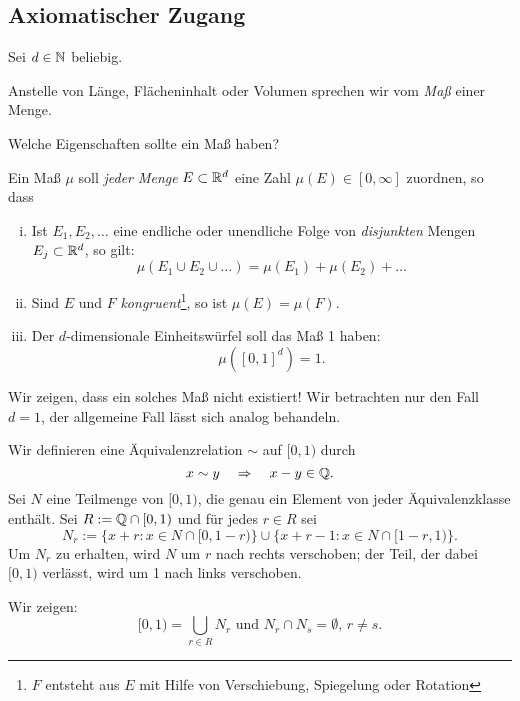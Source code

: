 \documentclass[
 a4paper,
 12pt,
 parskip=half
 ]{scrreprt}
\theoremstyle{plain}
\theoremstyle{definition}
\numberwithin{equation}{section}
\begin{document}
\subsection*{Axiomatischer Zugang}
Sei $d \in \mathbb{N}$ beliebig. 

Anstelle von Länge, Flächeninhalt oder Volumen sprechen wir vom \emph{Maß} einer Menge.

Welche Eigenschaften sollte ein Maß haben?

Ein Maß $\mu$ soll \emph{jeder Menge} $E \subset \mathbb{R}^d$ eine Zahl $\mu(E) \in [0, \infty]$ zuordnen, so dass
\begin{enumerate}[(i)]
 \item Ist $E_1, E_2, \ldots$ eine endliche oder unendliche Folge von \emph{disjunkten} Mengen $E_j \subset \mathbb{R}^d$, so gilt:
 \[ \mu(E_1 \cup E_2 \cup \ldots ) = \mu(E_1) + \mu(E_2) + \ldots \]
 \item Sind $E$ und $F$ \emph{kongruent}\footnote{$F$ entsteht aus $E$ mit Hilfe von Verschiebung, Spiegelung oder Rotation}, so ist $\mu(E) = \mu(F)$.
 \item Der $d$-dimensionale Einheitswürfel soll das Maß 1 haben:
  \[ \mu([0,1]^d) = 1. \]
\end{enumerate}

Wir zeigen, dass ein solches Maß nicht existiert! Wir betrachten nur den Fall $d=1$, der allgemeine Fall lässt sich analog behandeln.

Wir definieren eine Äquivalenzrelation $\sim$ auf $[0,1)$ durch
\[ x \sim y \quad \Rightarrow \quad x-y \in \mathbb{Q}. \]
Sei $N$ eine Teilmenge von $[0,1)$, die genau ein Element von jeder Äquivalenzklasse enthält. Sei $R := \mathbb{Q} \cap [0,1)$ und für jedes $r \in R$ sei 
\[ N_r := \{ x + r: x \in N \cap [0,1-r) \} \cup \{ x + r - 1: x \in N \cap [1-r,1) \}. \]
Um $N_r$ zu erhalten, wird $N$ um $r$ nach rechts verschoben; der Teil, der dabei $[0,1)$ verlässt, wird um 1 nach links verschoben.

Wir zeigen:
\[ [0,1) = \bigcup_{r \in R} N_r \text{ und } N_r \cap N_s = \emptyset,\, r \ne s. \]
\end{document}
